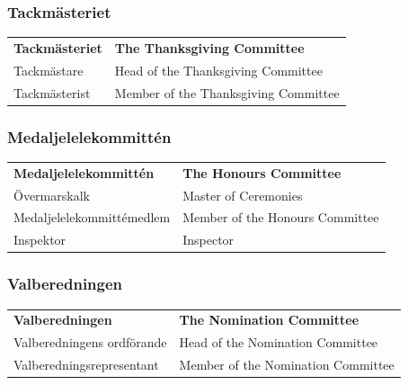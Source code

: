 \documentclass{dsekprotokoll}
\begin{document}
\subsubsection*{Tackmästeriet}
\vspace{12pt}
\begin{center}
    \begin{tabular}{R{7cm}|L{7cm}}
        \textbf{Tackmästeriet} & \textbf{The Thanksgiving Committee}\\
        Tackmästare & Head of the Thanksgiving Committee\\
        Tackmästerist & Member of the Thanksgiving Committee\\
    \end{tabular}
\end{center}

\subsubsection*{Medaljelelekommittén}
\vspace{12pt}
\begin{center}
    \begin{tabular}{R{6.5cm}|L{6.5cm}}
        \textbf{Medaljelelekommittén} & \textbf{The Honours Committee}\\
        Övermarskalk & Master of Ceremonies\\
        Medaljelelekommittémedlem & Member of the Honours Committee\\
        Inspektor & Inspector
    \end{tabular}
\end{center}


\subsubsection*{Valberedningen}
\vspace{12pt}
\begin{center}
    \begin{tabular}{R{6.5cm}|L{6.5cm}}
        \textbf{Valberedningen} & \textbf{The Nomination Committee}\\
        Valberedningens ordförande & Head of the Nomination Committee\\
        Valberedningsrepresentant & Member of the Nomination Committee\\
    \end{tabular}
\end{center}
\end{document}
